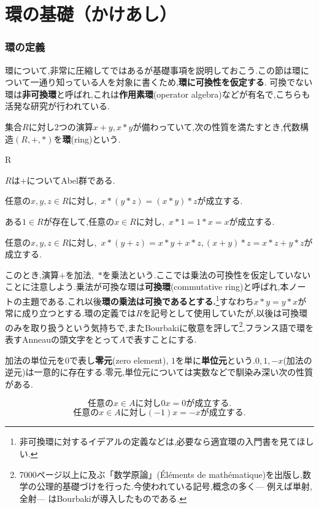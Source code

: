 \setcounter{part}{-1}
\part[Definition of Ring and more...]{環の基礎（かけあし）}
\section{環の定義}

環について,非常に圧縮してではあるが基礎事項を説明しておこう.この節は環について一通り知っている人を対象に書くため,\textbf{環に可換性を仮定する}. 可換でない環は\textbf{非可換環}と呼ばれ,これは\textbf{作用素環}(operator algebra)などが有名で,こちらも活発な研究が行われている.
\begin{defi}[環]
	集合$R$に対し2つの演算$x+y,x*y$が備わっていて,次の性質を満たすとき,代数構造$(R,+,*)$を\textbf{環}(ring)という.
	\begin{defiterm}{R}
		\item $R$は$+$についてAbel群である.
		\item 任意の$x,y,z\in R$に対し,~$x*(y*z)=(x*y)*z$が成立する.
		\item ある$1\in R$が存在して,任意の$x\in R$に対し,~$x*1=1*x=x$が成立する.
		\item 任意の$x,y,z\in R$に対し,~$x*(y+z)=x*y+x*z,(x+y)*z=x*z+y*z$が成立する.
	\end{defiterm}
\end{defi}

このとき,演算$+$を加法,~$*$を乗法という.ここでは乗法の可換性を仮定していないことに注意しよう.乗法が可換な環は\textbf{可換環}(commutative ring)と呼ばれ,本ノートの主題である.これ以後\textbf{環の乗法は可換であるとする.}\footnote{非可換環に対するイデアルの定義などは,必要なら適宜環の入門書を見てほしい.}すなわち$x*y=y*x$が常に成り立つとする.環の定義では$R$を記号として使用していたが,以後は可換環のみを取り扱うという気持ちで,またBourbakiに敬意を評して\footnote{7000ページ以上に及ぶ「数学原論」(Éléments de mathématique)を出版し,数学の公理的基礎づけを行った.今使われている記号,概念の多く--- 例えば単射,全射--- はBourbakiが導入したものである.},フランス語で環を表すAnneauの頭文字をとって$A$で表すことにする.

加法の単位元を$0$で表し\textbf{零元}(zero element), $1$を単に\textbf{単位元}という.$0,1,-x$(加法の逆元)は一意的に存在する.零元,単位元については実数などで馴染み深い次の性質がある.

\[\text{任意の}x\in A\text{に対し}0x=0\text{が成立する.}\]
\[\text{任意の}x\in A\text{に対し}(-1)x=-x\text{が成立する.}\]

